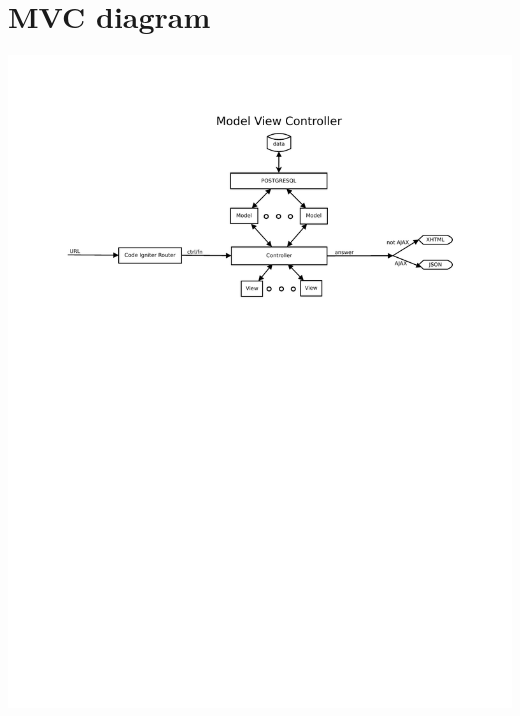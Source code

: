 \documentclass[12pt]{report}
\begin{document}
\chapter{MVC diagram}
\includegraphics[scale=0.7]{mvc.pdf}
\end{document}
